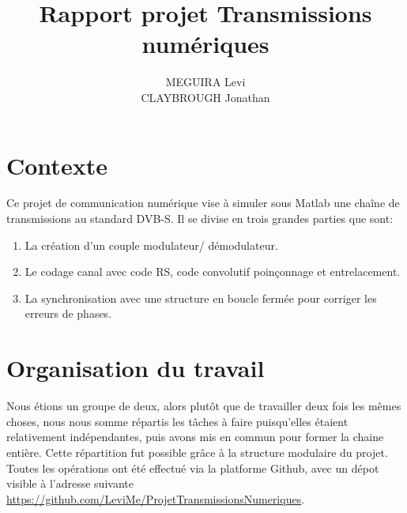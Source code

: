 \documentclass[a4paper,11pt]{article}
\title{Rapport projet Transmissions numériques}
\author{MEGUIRA Levi \\
	CLAYBROUGH Jonathan}
\begin{document}
\maketitle

\begin{comment}
	\textbf{Remarque importante: Notre chaine de transmission ne \emph{donne pas l'air} de transmettre \emph{un} signal complexe mais bien deux signaux distincts qui subissent exactement les mêmes opérations. Afin de respecter au possible le schéma de l'énoncé ainsi que le principe de ne jamais répeter de code en Matlab, il importe de créer un signal numérique \emph{réelement complexe} (sans jeu de mot) à partir des bits de départ et de transmettre un seul et même objet d'une extrémité à l'autre. \\ Le caractère universel des fonctions Matlab suffit à faire appliquer toutes les fonctions utilisés dans ce code à un vecteur complexe définie par \texttt{symboles=bitsI+j*bitsQ}}
\end{comment}

\section*{Contexte}
Ce projet de communication numérique vise à simuler sous Matlab une chaîne de transmissions au standard DVB-S. Il se divise en trois grandes parties que sont:
\begin{enumerate}
	\item La création d'un couple modulateur/ démodulateur.
	\item Le codage canal avec code RS, code convolutif poinçonnage et entrelacement.
	\item La synchronisation avec une structure en boucle fermée pour corriger les erreurs de phases.
\end{enumerate}

\tableofcontents

\section{Organisation du travail}
Nous étions un groupe de deux, alors plutôt que de travailler deux fois les mêmes choses, nous nous somme répartis les tâches à faire puisqu'elles étaient relativement indépendantes, puis avons mis en commun pour former la chaine entière.
\newline
Cette répartition fut possible grâce à la structure modulaire du projet. Toutes les opérations ont été effectué via la platforme Github, avec un dépot visible à l'adresse suivante \url{https://github.com/LeviMe/ProjetTransmissionsNumeriques}.
\end{document}
